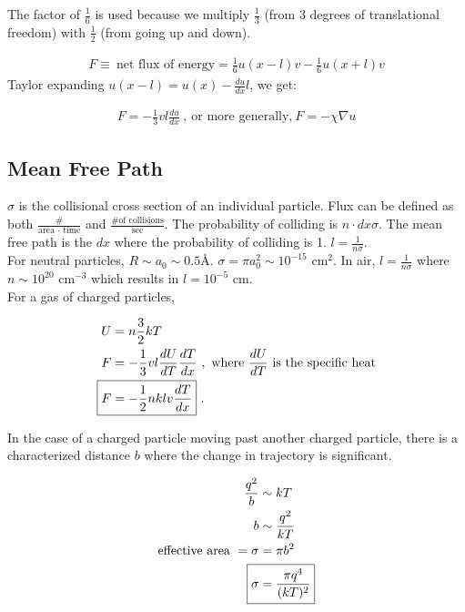 \documentclass[10pt,letterpaper,final]{book}
\begin{document}
The factor of $\frac{1}{6}$ is used because we multiply $\frac{1}{3}$ (from 3 degrees of translational freedom) with $\frac{1}{2}$ (from going up and down).

\begin{align}
F \equiv ~\text{net flux of energy} = \frac{1}{6}u(x-l)v - \frac{1}{6}u(x+l)v
\end{align}
Taylor expanding $u(x-l) = u(x) - \frac{du}{dx}l$, we get:

\begin{align}
F = -\frac{1}{3}vl\frac{du}{dx}~,~\text{or more generally,}~F=-\chi \nabla u
\end{align}

\subsection{Mean Free Path}
$\sigma$ is the collisional cross section of an individual particle. Flux can be defined as both $\frac{\text{\#}}{\text{area $\cdot$ time}}$ and $\frac{\text{\# of collisions}}{\text{sec}}$. The probability of colliding is $n \cdot dx \sigma$. The mean free path is the $dx$ where the probability of colliding is 1. $l = \frac{1}{n \sigma}$.\\
For neutral particles, $ R \sim a_0 \sim 0.5$\AA. $\sigma = \pi a_0^2 \sim 10^{-15}$ cm$^2$. In air, $l = \frac{1}{n \sigma}$ where $ n \sim 10^{20}$ cm$^{-3}$ which results in $l = 10^{-5}$ cm. \\

For a gas of charged particles,

\begin{align}
U &= n\frac{3}{2}kT\\
F &= -\frac{1}{3}vl \frac{dU}{dT}\frac{dT}{dx}~,~\text{where}~\frac{dU}{dT}~\text{is the specific heat}\\
\Aboxed{F &= -\frac{1}{2}nklv \frac{dT}{dx}}~.
\end{align}

In the case of a charged particle moving past another charged particle, there is a characterized distance $b$ where the change in trajectory is significant. 

\begin{align}
\frac{q^2}{b} &\sim kT\\
b &\sim \frac{q^2}{kT}\\
\text{effective area }=\sigma &= \pi b^2\\
\Aboxed{\sigma &= \frac{\pi q^4}{(kT)^2}}
\end{align}
\end{document}

